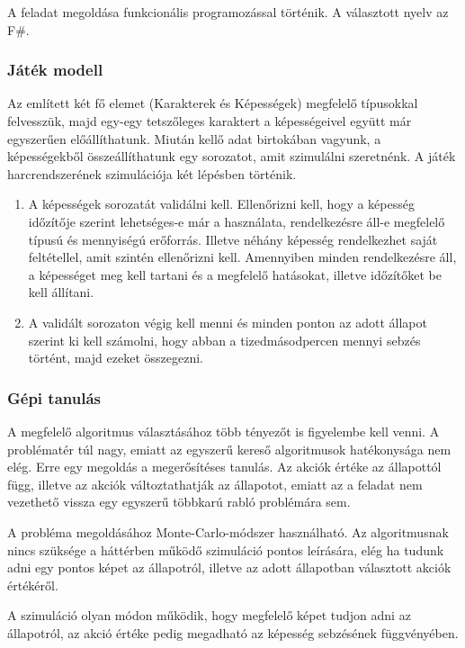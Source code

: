 \documentclass[12pt]{article}
\begin{document}
	A feladat megoldása funkcionális programozással történik. A választott nyelv az F\#.
	
	\subsubsection{Játék modell}
	
	Az említett két fő elemet (Karakterek és Képességek) megfelelő típusokkal felvesszük, majd egy-egy tetszőleges karaktert a képességeivel együtt már egyszerűen előállíthatunk.
	Miután kellő adat birtokában vagyunk, a képességekből összeállíthatunk egy sorozatot, amit szimulálni szeretnénk.
	\newline
	A játék harcrendszerének szimulációja két lépésben történik.
	\begin{enumerate}
		\item A képességek sorozatát validálni kell. Ellenőrizni kell, hogy a képesség időzítője szerint lehetséges-e már a használata, rendelkezésre áll-e megfelelő típusú és mennyiségú erőforrás. Illetve néhány képesség rendelkezhet saját feltétellel, amit szintén ellenőrizni kell. Amennyiben minden rendelkezésre áll, a képességet meg kell tartani és a megfelelő hatásokat, illetve időzítőket be kell állítani.
		\item A validált sorozaton végig kell menni és minden ponton az adott állapot szerint ki kell számolni, hogy abban a tizedmásodpercen mennyi sebzés történt, majd ezeket összegezni.
	\end{enumerate}
	
	\subsubsection{Gépi tanulás}
	
	A megfelelő algoritmus választásához több tényezőt is figyelembe kell venni. A problématér túl nagy, emiatt az egyszerű kereső algoritmusok hatékonysága nem elég. Erre egy megoldás a megerősítéses tanulás. 
	Az akciók értéke az állapottól függ, illetve az akciók változtathatják az állapotot, emiatt az a feladat nem vezethető vissza egy egyszerű többkarú rabló problémára sem.
	
	A probléma megoldásához Monte-Carlo-módszer használható. Az algoritmusnak nincs szüksége a háttérben működő szimuláció pontos leírására, elég ha tudunk adni egy pontos képet az állapotról, illetve az adott állapotban választott akciók értékéről.
	
	A szimuláció olyan módon működik, hogy megfelelő képet tudjon adni az állapotról, az akció értéke pedig megadható az képesség sebzésének függvényében.
	
\end{document}
